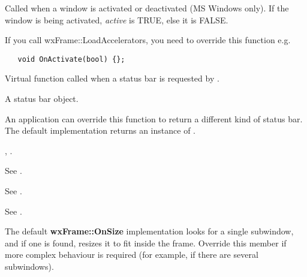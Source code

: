 Called when a window is activated or deactivated (MS Windows
only). If the window is being activated, {\it active} is TRUE, else it
is FALSE.

If you call wxFrame::LoadAccelerators, you need to override this function e.g.

\begin{verbatim}
   void OnActivate(bool) {};
\end{verbatim}

\label{wxframeoncreatestatusbar}


Virtual function called when a status bar is requested by .




A status bar object.


An application can override this function to return a different kind of status bar. The default
implementation returns an instance of .


, .

\label{wxframeonmenucommand}


See .

\label{wxframeonmenuhighlight}


See .

\label{wxframeonsize}


See .

The default {\bf wxFrame::OnSize} implementation looks for a single subwindow,
and if one is found, resizes it to fit
inside the frame. Override this member if more complex behaviour
is required (for example, if there are several subwindows).

